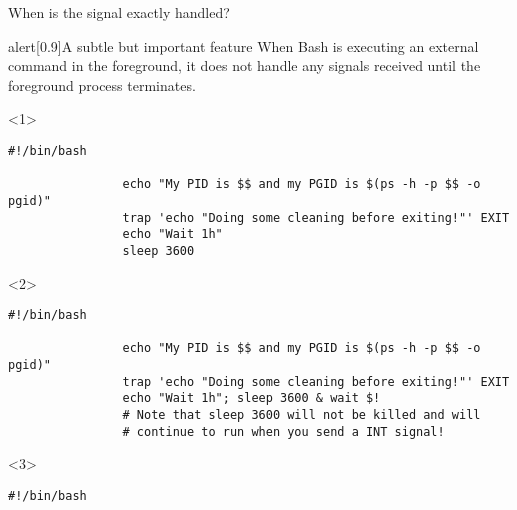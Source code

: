 \begin{frame}[fragile]{When is the signal exactly handled?}
    \vspace{-5mm}
    \begin{varblock}{alert}[0.9\textwidth]{A subtle but important feature}
        When Bash is executing an external command in the foreground, it does not handle any signals received until the foreground process terminates.
    \end{varblock}
    \begin{overlayarea}{\textwidth}{0.33\textheight}
        \begin{onlyenv}<1>
            \begin{lstlisting}[style=MyBash]
                #!/bin/bash
                
                echo "My PID is $$ and my PGID is $(ps -h -p $$ -o pgid)"
                trap 'echo "Doing some cleaning before exiting!"' EXIT
                echo "Wait 1h"
                sleep 3600
            \end{lstlisting}
        \end{onlyenv}
        \begin{onlyenv}<2>
            \begin{lstlisting}[style=MyBash, firstnumber=7]
                #!/bin/bash
                
                echo "My PID is $$ and my PGID is $(ps -h -p $$ -o pgid)"
                trap 'echo "Doing some cleaning before exiting!"' EXIT
                echo "Wait 1h"; sleep 3600 & wait $!
                # Note that sleep 3600 will not be killed and will
                # continue to run when you send a INT signal!
            \end{lstlisting}
        \end{onlyenv}
        \begin{onlyenv}<3>
            \begin{lstlisting}[style=MyBash, firstnumber=14]
                #!/bin/bash
                

\end{lstlisting}
\end{onlyenv}
\end{overlayarea}
\end{frame}
